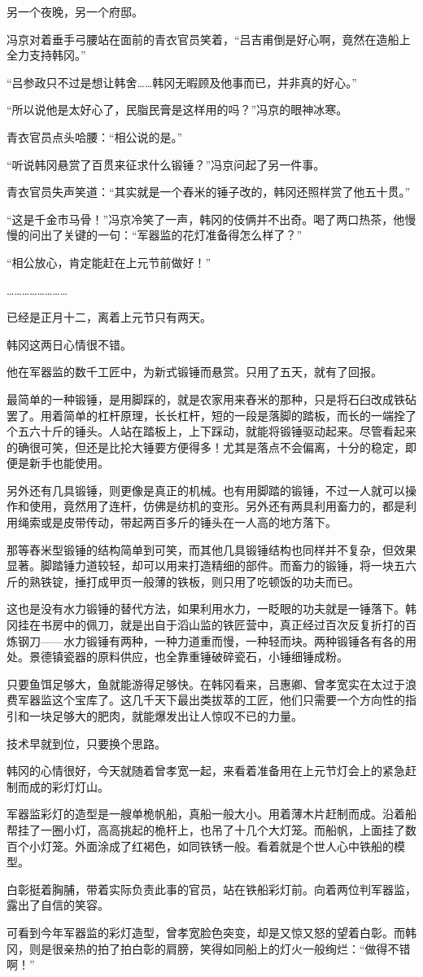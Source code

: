 另一个夜晚，另一个府邸。

冯京对着垂手弓腰站在面前的青衣官员笑着，“吕吉甫倒是好心啊，竟然在造船上全力支持韩冈。”

“吕参政只不过是想让韩舍……韩冈无暇顾及他事而已，并非真的好心。”

“所以说他是太好心了，民脂民膏是这样用的吗？”冯京的眼神冰寒。

青衣官员点头哈腰：“相公说的是。”

“听说韩冈悬赏了百贯来征求什么锻锤？”冯京问起了另一件事。

青衣官员失声笑道：“其实就是一个舂米的锤子改的，韩冈还照样赏了他五十贯。”

“这是千金市马骨！”冯京冷笑了一声，韩冈的伎俩并不出奇。喝了两口热茶，他慢慢的问出了关键的一句：“军器监的花灯准备得怎么样了？”

“相公放心，肯定能赶在上元节前做好！”

……………………

已经是正月十二，离着上元节只有两天。

韩冈这两日心情很不错。

他在军器监的数千工匠中，为新式锻锤而悬赏。只用了五天，就有了回报。

最简单的一种锻锤，是用脚踩的，就是农家用来舂米的那种，只是将石臼改成铁砧罢了。用着简单的杠杆原理，长长杠杆，短的一段是落脚的踏板，而长的一端拴了个五六十斤的锤头。人站在踏板上，上下踩动，就能将锻锤驱动起来。尽管看起来的确很可笑，但还是比抡大锤要方便得多！尤其是落点不会偏离，十分的稳定，即便是新手也能使用。

另外还有几具锻锤，则更像是真正的机械。也有用脚踏的锻锤，不过一人就可以操作和使用，竟然用了连杆，仿佛是纺机的变形。另外还有两具利用畜力的，都是利用绳索或是皮带传动，带起两百多斤的锤头在一人高的地方落下。

那等舂米型锻锤的结构简单到可笑，而其他几具锻锤结构也同样并不复杂，但效果显著。脚踏锤力道较轻，却可以用来打造精细的部件。而畜力的锻锤，将一块五六斤的熟铁锭，捶打成甲页一般薄的铁板，则只用了吃顿饭的功夫而已。

这也是没有水力锻锤的替代方法，如果利用水力，一眨眼的功夫就是一锤落下。韩冈挂在书房中的佩刀，就是出自于滔山监的铁匠营中，真正经过百次反复折打的百炼钢刀——水力锻锤有两种，一种力道重而慢，一种轻而块。两种锻锤各有各的用处。景德镇瓷器的原料供应，也全靠重锤破碎瓷石，小锤细锤成粉。

只要鱼饵足够大，鱼就能游得足够快。在韩冈看来，吕惠卿、曾孝宽实在太过于浪费军器监这个宝库了。这几千天下最出类拔萃的工匠，他们只需要一个方向性的指引和一块足够大的肥肉，就能爆发出让人惊叹不已的力量。

技术早就到位，只要换个思路。

韩冈的心情很好，今天就随着曾孝宽一起，来看着准备用在上元节灯会上的紧急赶制而成的彩灯灯山。

军器监彩灯的造型是一艘单桅帆船，真船一般大小。用着薄木片赶制而成。沿着船帮挂了一圈小灯，高高挑起的桅杆上，也吊了十几个大灯笼。而船帆，上面挂了数百个小灯笼。外面涂成了红褐色，如同铁锈一般。看着就是个世人心中铁船的模型。

白彰挺着胸脯，带着实际负责此事的官员，站在铁船彩灯前。向着两位判军器监，露出了自信的笑容。

可看到今年军器监的彩灯造型，曾孝宽脸色突变，却是又惊又怒的望着白彰。而韩冈，则是很亲热的拍了拍白彰的肩膀，笑得如同船上的灯火一般绚烂：“做得不错啊！”

